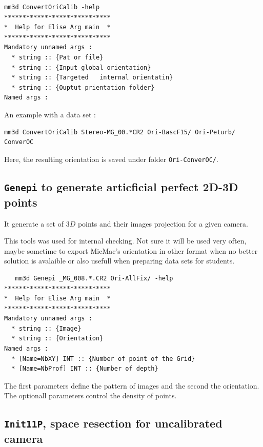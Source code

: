 \begin{verbatim}
mm3d ConvertOriCalib -help
*****************************
*  Help for Elise Arg main  *
*****************************
Mandatory unnamed args : 
  * string :: {Pat or file}
  * string :: {Input global orientation}
  * string :: {Targeted   internal orientatin}
  * string :: {Ouptut prientation folder}
Named args : 
\end{verbatim}

An example with a data set :

\begin{verbatim}
mm3d ConvertOriCalib Stereo-MG_00.*CR2 Ori-BascF15/ Ori-Peturb/ ConverOC
\end{verbatim}

Here, the resulting orientation is saved under folder {\tt Ori-ConverOC/}.





\subsection{{\tt Genepi} to generate articficial perfect 2D-3D points}

It generate a set of $3D$ points and their images projection for a given camera.

This tools was used for internal checking. Not sure it will be used very often, maybe sometime to export 
MicMac's orientation in other format when no better solution is avalaible or also usefull when preparing
data sets for students.

\begin{verbatim}
   mm3d Genepi _MG_008.*.CR2 Ori-AllFix/ -help
*****************************
*  Help for Elise Arg main  *
*****************************
Mandatory unnamed args : 
  * string :: {Image}
  * string :: {Orientation}
Named args : 
  * [Name=NbXY] INT :: {Number of point of the Grid}
  * [Name=NbProf] INT :: {Number of depth}

\end{verbatim}

The first parameters define the  pattern of images and the second the orientation. The optionall parameters control
the density of points.



\subsection{{\tt Init11P}, space resection for uncalibrated camera}

